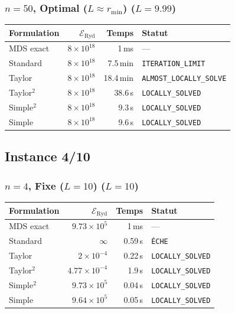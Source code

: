 \subsubsection{$n=50$, Optimal ($L{\approx}r_{\min}$) ($L=9.99$)}
\begin{longtable}{@{}lrrl@{}}
  \toprule
  Formulation & $\mathcal{E}_{\mathrm{Ryd}}$ & Temps & Statut \\
  \midrule
  \endhead
  MDS exact & $8\times10^{18}$ & 1\,ms & --- \\
  Standard & $8\times10^{18}$ & 7.5\,min & \texttt{ITERATION\_LIMIT} \\
  Taylor & $8\times10^{18}$ & 18.4\,min & \texttt{ALMOST\_LOCALLY\_SOLVE} \\
  Taylor$^2$ & $8\times10^{18}$ & 38.6\,s & \texttt{LOCALLY\_SOLVED} \\
  Simple$^2$ & $8\times10^{18}$ & 9.3\,s & \texttt{LOCALLY\_SOLVED} \\
  Simple & $8\times10^{18}$ & 9.6\,s & \texttt{LOCALLY\_SOLVED} \\
  \bottomrule
\end{longtable}

\subsection{Instance 4/10}
\subsubsection{$n=4$, Fixe ($L{=}10$) ($L=10$)}
\begin{longtable}{@{}lrrl@{}}
  \toprule
  Formulation & $\mathcal{E}_{\mathrm{Ryd}}$ & Temps & Statut \\
  \midrule
  \endhead
  MDS exact & $9.73\times10^{5}$ & 1\,ms & --- \\
  Standard & $\infty$ & 0.59\,s & \texttt{ÉCHE} \\
  Taylor & $2\times10^{-4}$ & 0.22\,s & \texttt{LOCALLY\_SOLVED} \\
  Taylor$^2$ & $4.77\times10^{-4}$ & 1.9\,s & \texttt{LOCALLY\_SOLVED} \\
  Simple$^2$ & $9.73\times10^{5}$ & 0.04\,s & \texttt{LOCALLY\_SOLVED} \\
  Simple & $9.64\times10^{5}$ & 0.05\,s & \texttt{LOCALLY\_SOLVED} \\
  \bottomrule
\end{longtable}

